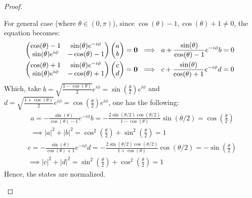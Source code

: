 \documentclass{article}
\begin{document}
\begin{proof}
\begin{itemize}
\begin{itemize}
        \end{itemize}
        For general case (where $\theta\in (0,\pi)$), since $\cos(\theta)-1,\cos(\theta)+1\neq 0$, the equation becomes:
        \begin{align}
            &\begin{pmatrix}
                \cos(\theta)-1 & \sin(\theta)e^{-i\phi}\\
                \sin(\theta)e^{i\phi} & -\cos(\theta)-1
            \end{pmatrix}\begin{pmatrix}
                a\\b
            \end{pmatrix}=\bzero\ \implies\ a+\frac{\sin(\theta)}{\cos(\theta)-1}e^{-i\phi}b=0\\
            &\begin{pmatrix}
                \cos(\theta)+1 & \sin(\theta)e^{-i\phi}\\
                \sin(\theta)e^{i\phi} & -\cos(\theta)+1
            \end{pmatrix}\begin{pmatrix}
                c\\d
            \end{pmatrix}=\bzero\ \implies\ c+\frac{\sin(\theta)}{\cos(\theta)+1}e^{-i\phi}d=0
        \end{align}
        Which, take $b=\sqrt{\frac{1-\cos(\theta)}{2}}e^{i\phi} = \sin(\frac{\theta}{2})e^{i\phi}$ and $d = \sqrt{\frac{1+\cos(\theta)}{2}}e^{i\phi}=\cos(\frac{\theta}{2})e^{i\phi}$, one has the following:
        \begin{align}
            &a = -\frac{\sin(\theta)}{\cos(\theta)-1}e^{-i\phi}b = -\frac{2\sin(\theta/2)\cos(\theta/2)}{1-\cos(\theta)}\sin(\theta/2) = \cos\left(\frac{\theta}{2}\right)\\
            &\implies |a|^2+|b|^2 = \cos^2\left(\frac{\theta}{2}\right)+\sin^2\left(\frac{\theta}{2}\right)=1
        \end{align}
        \begin{align}
            &c = -\frac{\sin(\theta)}{\cos(\theta)+1}e^{-i\phi}d = -\frac{2\sin(\theta/2)\cos(\theta/2)}{1+\cos(\theta)}\cos(\theta/2) = -\sin\left(\frac{\theta}{2}\right)\\
            &\implies |c|^2+|d|^2 = \sin^2\left(\frac{\theta}{2}\right)+\cos^2\left(\frac{\theta}{2}\right) = 1
        \end{align}
        Hence, the states are normalized. 


\end{itemize}
\end{proof}
\end{document}
